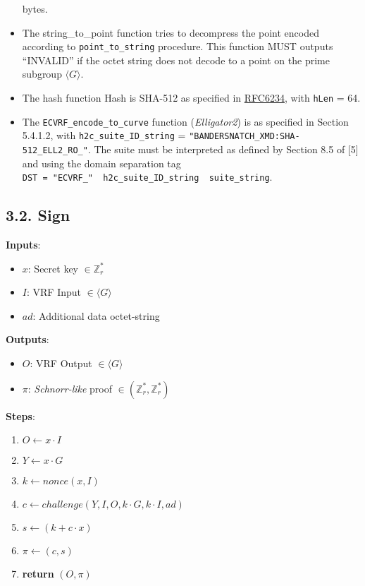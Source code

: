 \documentclass[
]{article}
\providecommand{\tightlist}{%
  \setlength{\itemsep}{0pt}\setlength{\parskip}{0pt}}
\begin{document}
\begin{itemize}
  bytes.
\item
  The string\_to\_point function tries to decompress the point encoded
  according to \texttt{point\_to\_string} procedure. This function MUST
  outputs ``INVALID'' if the octet string does not decode to a point on
  the prime subgroup \(\langle G \rangle\).
\item
  The hash function Hash is SHA-512 as specified in
  \href{https://www.rfc-editor.org/rfc/rfc6234}{RFC6234}, with
  \texttt{hLen} = 64.
\item
  The \texttt{ECVRF\_encode\_to\_curve} function (\emph{Elligator2}) is
  as specified in Section 5.4.1.2, with \texttt{h2c\_suite\_ID\_string}
  = \texttt{"BANDERSNATCH\_XMD:SHA-512\_ELL2\_RO\_"}. The suite must be
  interpreted as defined by Section 8.5 of {[}5{]} and using the domain
  separation tag
  \texttt{DST\ =\ "ECVRF\_"\ \textbar{}\textbar{}\ h2c\_suite\_ID\_string\ \textbar{}\textbar{}\ suite\_string}.
\end{itemize}

\hypertarget{sign}{%
\subsection{3.2. Sign}\label{sign}}

\textbf{Inputs}:

\begin{itemize}
\tightlist
\item
  \(x\): Secret key \(\in \mathbb{Z}^*_r\)
\item
  \(I\): VRF Input \(\in \langle G \rangle\)
\item
  \(ad\): Additional data octet-string
\end{itemize}

\textbf{Outputs}:

\begin{itemize}
\tightlist
\item
  \(O\): VRF Output \(\in \langle G \rangle\)
\item
  \(\pi\): \emph{Schnorr-like} proof
  \(\in (\mathbb{Z}^*_r, \mathbb{Z}^*_r)\)
\end{itemize}

\textbf{Steps}:

\begin{enumerate}
\def\labelenumi{\arabic{enumi}.}
\tightlist
\item
  \(O \leftarrow x \cdot I\)
\item
  \(Y \leftarrow x \cdot G\)
\item
  \(k \leftarrow nonce(x, I)\)
\item
  \(c \leftarrow challenge(Y, I, O, k \cdot G, k \cdot I, ad)\)
\item
  \(s \leftarrow (k + c \cdot x)\)
\item
  \(\pi \leftarrow (c, s)\)
\item
  \textbf{return} \((O, \pi)\)
\end{enumerate}
\end{document}

